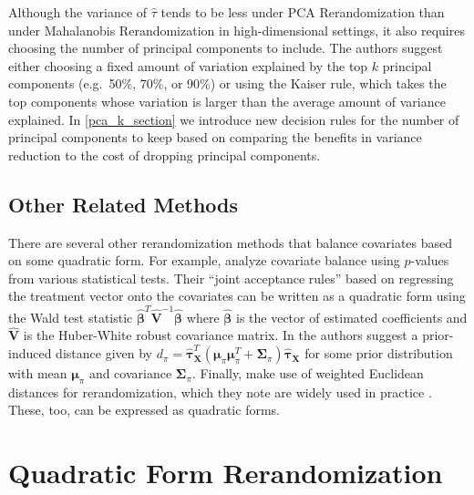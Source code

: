 \documentclass[11pt,twoside]{article}
\theoremstyle{definition}
\theoremstyle{remark}
\begin{document}
Although the variance of $\widehat{\tau}$ tends to be less under PCA Rerandomization than under Mahalanobis Rerandomization in high-dimensional settings, it also requires choosing the number of principal components to include. The authors suggest either choosing a fixed amount of variation explained by the top $k$ principal components (e.g.\ 50\%, 70\%, or 90\%) or using the Kaiser rule, which takes the top components whose variation is larger than the average amount of variance explained. In \cref{pca_k_section} we introduce new decision rules for the number of principal components to keep based on comparing the benefits in variance reduction to the cost of dropping principal components.

\subsection{Other Related Methods}

There are several other rerandomization methods that balance covariates based on some quadratic form. For example, \cite{zhao2021no} analyze covariate balance using $p$-values from various statistical tests. Their ``joint acceptance rules'' based on regressing the treatment vector onto the covariates can be written as a quadratic form using the Wald test statistic $\widehat{\bm{\beta}}^T \widehat{\mathbf{V}}^{-1} \widehat{\bm{\beta}}$ where $\widehat{\bm{\beta}}$ is the vector of estimated coefficients and $\widehat{\mathbf{V}}$ is the Huber-White robust covariance matrix. In \cite{liu2023bayesian} the authors suggest a prior-induced distance given by $d_\pi = \widehat{\bm{\tau}}_{\mathbf{X}}^T (\bm{\mu}_\pi \bm{\mu}_\pi^T + \mathbf{\Sigma}_\pi) \widehat{\bm{\tau}}_{\mathbf{X}}$ for some prior distribution with mean $\bm{\mu}_{\pi}$ and covariance $\mathbf{\Sigma}_{\pi}$. Finally, \cite{lu2023design} make use of weighted Euclidean distances for rerandomization, which they note are widely used in practice \citep{liweighted, hayescluster}. These, too, can be expressed as quadratic forms.


\section{Quadratic Form Rerandomization} \label{QFR_section}
\end{document}
